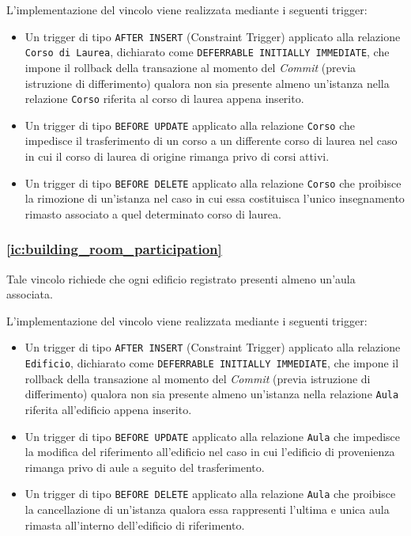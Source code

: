 \documentclass[a4paper,11pt]{article}
\begin{document}
L'implementazione del vincolo viene realizzata mediante i seguenti trigger:
\begin{itemize}
    \item Un trigger di tipo \texttt{AFTER INSERT} (Constraint Trigger) applicato alla relazione \texttt{Corso di Laurea}, dichiarato come \texttt{DEFERRABLE INITIALLY IMMEDIATE}, che impone il rollback della transazione al momento del \textit{Commit} (previa istruzione di differimento) qualora non sia presente almeno un'istanza nella relazione \texttt{Corso} riferita al corso di laurea appena inserito.
    \item Un trigger di tipo \texttt{BEFORE UPDATE} applicato alla relazione \texttt{Corso} che impedisce il trasferimento di un corso a un differente corso di laurea nel caso in cui il corso di laurea di origine rimanga privo di corsi attivi.
    \item Un trigger di tipo \texttt{BEFORE DELETE} applicato alla relazione \texttt{Corso} che proibisce la rimozione di un'istanza nel caso in cui essa costituisca l'unico insegnamento rimasto associato a quel determinato corso di laurea.
\end{itemize}

\subsubsection{\ref{ic:building_room_participation}}

Tale vincolo richiede che ogni edificio registrato presenti almeno un'aula associata.

L'implementazione del vincolo viene realizzata mediante i seguenti trigger:
\begin{itemize}
    \item Un trigger di tipo \texttt{AFTER INSERT} (Constraint Trigger) applicato alla relazione \texttt{Edificio}, dichiarato come \texttt{DEFERRABLE INITIALLY IMMEDIATE}, che impone il rollback della transazione al momento del \textit{Commit} (previa istruzione di differimento) qualora non sia presente almeno un'istanza nella relazione \texttt{Aula} riferita all'edificio appena inserito.
    \item Un trigger di tipo \texttt{BEFORE UPDATE} applicato alla relazione \texttt{Aula} che impedisce la modifica del riferimento all'edificio nel caso in cui l'edificio di provenienza rimanga privo di aule a seguito del trasferimento.
    \item Un trigger di tipo \texttt{BEFORE DELETE} applicato alla relazione \texttt{Aula} che proibisce la cancellazione di un'istanza qualora essa rappresenti l'ultima e unica aula rimasta all'interno dell'edificio di riferimento.
\end{itemize}
\end{document}
